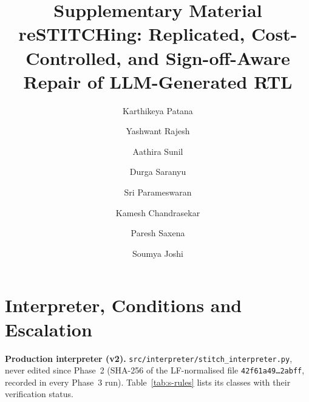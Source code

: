\documentclass[11pt]{article}
\title{\textbf{Supplementary Material}\\[4pt]
\large\textnormal{reSTITCHing: Replicated, Cost-Controlled, and Sign-off-Aware Repair of LLM-Generated RTL}}
\author{Karthikeya Patana \and Yashwant Rajesh \and Aathira Sunil \and Durga Saranyu \and Sri Parameswaran \and Kamesh Chandrasekar \and Paresh Saxena \and Soumya Joshi}
\date{}
\begin{document}
\sloppy
\maketitle
\tableofcontents

\section{Interpreter, Conditions and Escalation}
\label{s:interp}

\textbf{Production interpreter (v2).} \texttt{src/interpreter/stitch\_interpreter.py},
never edited since Phase~2 (SHA-256 of the LF-normalised file
\texttt{42f61a49\ldots2abff}, recorded in every Phase~3 run). Table~\ref{tab:s-rules}
lists its classes with their verification status.
\end{document}
